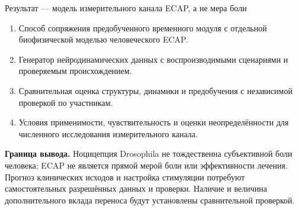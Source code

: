 \begin{frame}{Результат --- модель измерительного канала ECAP, а не мера боли}
\begin{enumerate}
\item Способ сопряжения предобученного временного модуля с отдельной биофизической моделью человеческого ECAP.
\item Генератор нейродинамических данных с воспроизводимыми сценариями и проверяемым происхождением.
\item Сравнительная оценка структуры, динамики и предобучения с независимой проверкой по участникам.
\item Условия применимости, чувствительность и оценки неопределённости для численного исследования измерительного канала.
\end{enumerate}
\SlideGap
\textbf{Граница вывода.} Ноцицепция Drosophila не тождественна субъективной боли человека; ECAP не является прямой мерой боли или эффективности лечения.
\SlideGap
Прогноз клинических исходов и настройка стимуляции потребуют самостоятельных разрешённых данных и проверки.
\SlideGap
Наличие и величина дополнительного вклада переноса будут установлены сравнительной проверкой.
\end{frame}

